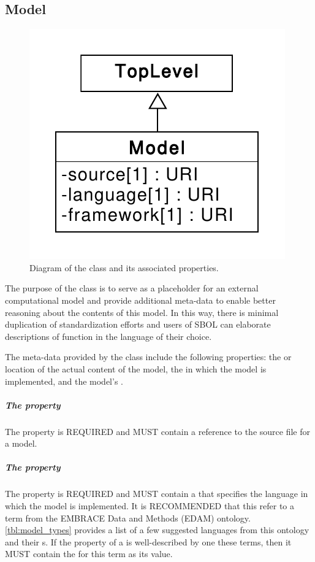 \subsection{Model}
\label{sec:Model}

\begin{figure}[ht]
\begin{center}
\includegraphics[scale=0.6]{uml/model}
\caption[]{Diagram of the  class and its associated properties.}
\label{uml:model}
\end{center}
\end{figure}

The purpose of the  class is to serve as a placeholder for an external computational model and provide additional meta-data to enable better reasoning about the contents of this model.
In this way, there is minimal duplication of standardization efforts and users of SBOL can elaborate descriptions of  function in the language of their choice.

The meta-data provided by the  class include the following properties: the  or location of the actual content of the model, the  in which the model is implemented, and the model's .

\subparagraph{The  property}\label{sec:source:M}
The  property is REQUIRED and MUST contain a  reference to the source file for a model.

\subparagraph{The  property}\label{sec:language}
The  property is REQUIRED and MUST contain a  that specifies the language in which the model is implemented. 
It is RECOMMENDED that this  refer to a term from the EMBRACE Data and Methods (EDAM) ontology. \ref{tbl:model_types} provides a list of a few suggested languages from this ontology and their s. 
If the  property of a  is well-described by one these terms, then it MUST contain the  for this term as its value.

